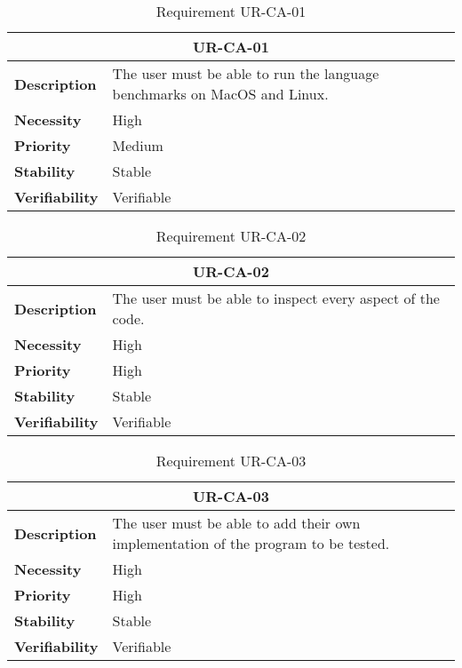\begin{table}[H]
    \centering
    \begin{tabular}{l p{10cm}}
        \toprule
        \multicolumn{2}{c}{UR-CA-01} \\
        \toprule
        \textbf{Description}        &  The user must be able to run the language benchmarks on MacOS and Linux.  \\
        \textbf{Necessity}          &  High   \\
        \textbf{Priority}           &  Medium   \\
        \textbf{Stability}          &  Stable   \\
        \textbf{Verifiability}       &  Verifiable \\
    \end{tabular}
    \caption{Requirement UR-CA-01}
    \label{tab:ur-ca-01}
\end{table}

\begin{table}[H]
    \centering
    \begin{tabular}{l p{10cm}}
        \toprule
        \multicolumn{2}{c}{UR-CA-02} \\
        \toprule
        \textbf{Description}        & The user must be able to inspect every aspect of the code. \\
        \textbf{Necessity}          & High  \\
        \textbf{Priority}           & High  \\
        \textbf{Stability}          & Stable \\
        \textbf{Verifiability}       & Verifiable \\
    \end{tabular}
    \caption{Requirement UR-CA-02}
    \label{tab:ur-ca-02}
\end{table}

\begin{table}[H]
    \centering
    \begin{tabular}{l p{10cm}}
        \toprule
        \multicolumn{2}{c}{UR-CA-03} \\
        \toprule
        \textbf{Description}        & The user must be able to add their own implementation of the program to be tested. \\
        \textbf{Necessity}          &  High   \\
        \textbf{Priority}           &  High   \\
        \textbf{Stability}          &  Stable \\
        \textbf{Verifiability}       &  Verifiable \\
    \end{tabular}
    \caption{Requirement UR-CA-03}
    \label{tab:ur-ca-03}
\end{table}

